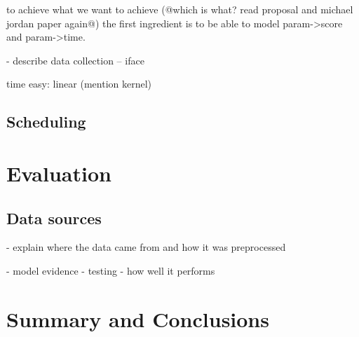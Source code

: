 \documentclass[a4paper,12pt,twoside,openright]{report}
\begin{document}
to achieve what we want to achieve (@which is what? read proposal and michael jordan paper again@) the first ingredient is to be able to model param->score and param->time.

- describe data collection
-- iface


time easy: linear (mention kernel)




\section{Scheduling} 



\chapter{Evaluation} 

\section{Data sources}
- explain where the data came from and how it was preprocessed


- model evidence
- testing
- how well it performs


\chapter{Summary and Conclusions} 





\appendix
\singlespacing

 

\end{document}
